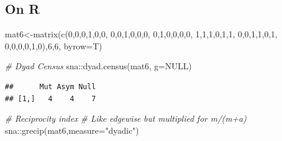 \documentclass[
  notitlepage,
  onecolumn,
  openany]{book}
\newenvironment{Shaded}{\begin{snugshade}}{\end{snugshade}}
\newcommand{\AttributeTok}[1]{\textcolor[rgb]{0.77,0.63,0.00}{#1}}
\newcommand{\CommentTok}[1]{\textcolor[rgb]{0.56,0.35,0.01}{\textit{#1}}}
\newcommand{\ConstantTok}[1]{\textcolor[rgb]{0.00,0.00,0.00}{#1}}
\newcommand{\DecValTok}[1]{\textcolor[rgb]{0.00,0.00,0.81}{#1}}
\newcommand{\FunctionTok}[1]{\textcolor[rgb]{0.00,0.00,0.00}{#1}}
\newcommand{\NormalTok}[1]{#1}
\newcommand{\OtherTok}[1]{\textcolor[rgb]{0.56,0.35,0.01}{#1}}
\newcommand{\SpecialCharTok}[1]{\textcolor[rgb]{0.00,0.00,0.00}{#1}}
\newcommand{\StringTok}[1]{\textcolor[rgb]{0.31,0.60,0.02}{#1}}
\begin{document}
\hypertarget{on-r}{%
\subsection{On R}\label{on-r}}

\begin{Shaded}
\begin{Highlighting}[]
\NormalTok{mat6}\OtherTok{\textless{}{-}}\FunctionTok{matrix}\NormalTok{(}\FunctionTok{c}\NormalTok{(}\DecValTok{0}\NormalTok{,}\DecValTok{0}\NormalTok{,}\DecValTok{0}\NormalTok{,}\DecValTok{1}\NormalTok{,}\DecValTok{0}\NormalTok{,}\DecValTok{0}\NormalTok{,}
               \DecValTok{0}\NormalTok{,}\DecValTok{0}\NormalTok{,}\DecValTok{1}\NormalTok{,}\DecValTok{0}\NormalTok{,}\DecValTok{0}\NormalTok{,}\DecValTok{0}\NormalTok{,}
               \DecValTok{0}\NormalTok{,}\DecValTok{1}\NormalTok{,}\DecValTok{0}\NormalTok{,}\DecValTok{0}\NormalTok{,}\DecValTok{0}\NormalTok{,}\DecValTok{0}\NormalTok{,}
               \DecValTok{1}\NormalTok{,}\DecValTok{1}\NormalTok{,}\DecValTok{1}\NormalTok{,}\DecValTok{0}\NormalTok{,}\DecValTok{1}\NormalTok{,}\DecValTok{1}\NormalTok{,}
               \DecValTok{0}\NormalTok{,}\DecValTok{0}\NormalTok{,}\DecValTok{1}\NormalTok{,}\DecValTok{1}\NormalTok{,}\DecValTok{0}\NormalTok{,}\DecValTok{1}\NormalTok{,}
               \DecValTok{0}\NormalTok{,}\DecValTok{0}\NormalTok{,}\DecValTok{0}\NormalTok{,}\DecValTok{0}\NormalTok{,}\DecValTok{1}\NormalTok{,}\DecValTok{0}\NormalTok{),}\DecValTok{6}\NormalTok{,}\DecValTok{6}\NormalTok{, }\AttributeTok{byrow=}\NormalTok{T)}

\CommentTok{\# Dyad Census}
\NormalTok{sna}\SpecialCharTok{::}\FunctionTok{dyad.census}\NormalTok{(mat6, }\AttributeTok{g=}\ConstantTok{NULL}\NormalTok{)}
\end{Highlighting}
\end{Shaded}

\begin{verbatim}
##      Mut Asym Null
## [1,]   4    4    7
\end{verbatim}

\begin{Shaded}
\begin{Highlighting}[]
\CommentTok{\# Reciprocity index}
\CommentTok{\# Like edgewise but multiplied for m/(m+a)}
\NormalTok{sna}\SpecialCharTok{::}\FunctionTok{grecip}\NormalTok{(mat6,}\AttributeTok{measure=}\StringTok{"dyadic"}\NormalTok{)}
\end{Highlighting}
\end{Shaded}
\end{document}
